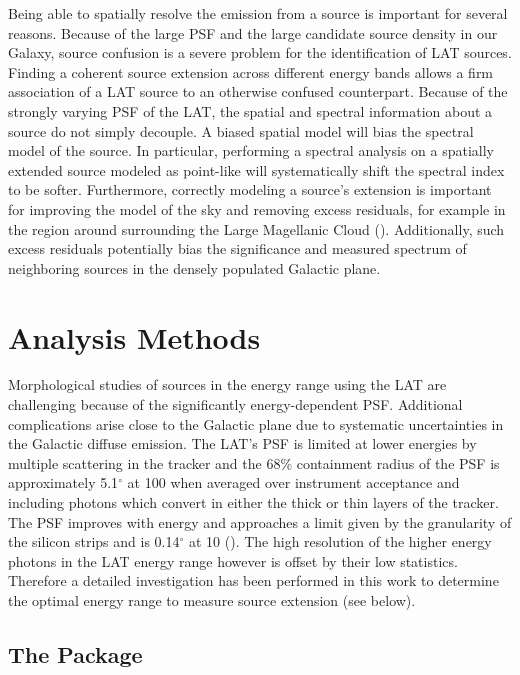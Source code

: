 \documentclass[12pt,preprint]{aastex}
\newcommand{\mev}{\text{MeV}\xspace}
\newcommand{\gev}{\text{GeV}\xspace}
\renewcommand{\deg}{\ensuremath{^\circ}\xspace}
\newcommand{\pointlike}{\text{\em pointlike}\xspace}
\begin{document}
Being able to spatially resolve the \gev emission from a source is
important for several reasons. Because of the large PSF and the large
candidate source density in our Galaxy, source confusion is a severe
problem for the identification of LAT sources.  Finding a coherent
source extension across different energy bands allows a firm association
of a LAT source to an otherwise confused counterpart.  Because of the
strongly varying PSF of the LAT, the spatial and spectral information
about a source do not simply decouple. A biased spatial model will bias
the spectral model of the source. In particular, performing a spectral
analysis on a spatially extended source modeled as point-like will
systematically shift the spectral index to be softer.  Furthermore,
correctly modeling a source's extension is important for improving
the model of the sky and removing excess residuals, for example in the
region around surrounding the Large Magellanic Cloud (\cite{first_cat}).
Additionally, such excess residuals potentially bias the significance
and measured spectrum of neighboring sources in the densely populated
Galactic plane.

\section{Analysis Methods}

Morphological studies of sources in the \gev energy range using the
LAT are challenging because of the significantly energy-dependent PSF.
Additional complications arise close to the Galactic plane due to
systematic uncertainties in the Galactic diffuse emission.  The LAT's
PSF is limited at lower energies by multiple scattering in the tracker
and the 68\% containment radius of the PSF is approximately 5.1\deg
at 100 \mev  when averaged over instrument acceptance and including
photons which convert in either the thick or thin layers of the
tracker. The PSF improves with energy and approaches a limit given
by the granularity of the silicon strips and is 0.14\deg at 10 \gev
(\cite{on_orbit_calibration}).  The high resolution of the higher
energy photons in the LAT energy range however is offset by their low
statistics. Therefore a detailed investigation has been performed in this
work to determine the optimal energy range to measure source extension
(see below).

\subsection{The \pointlike Package}
\end{document}
